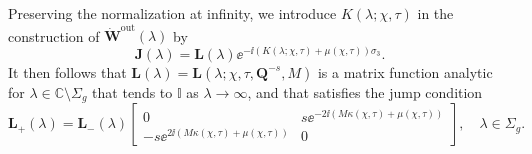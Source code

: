 %
Preserving the normalization at infinity, we introduce $K(\lambda;\chi,\tau)$ in the construction of $\dot{\mathbf{W}}^\text{out}(\lambda)$ by
\begin{equation}
\mathbf{J}(\lambda)=\mathbf{L}(\lambda)\ee^{-\ii (K(\lambda;\chi,\tau)+ \mu(\chi,\tau) )\sigma_3}.
\label{eq:G-H}
\end{equation}
It then follows that $\mathbf{L}(\lambda)=\mathbf{L}(\lambda;\chi,\tau,\mathbf{Q}^{-s},M)$ is a matrix function analytic for $\lambda\in\mathbb{C}\setminus\Sigma_g$ that tends to $\mathbb{I}$ as $\lambda\to\infty$, and that satisfies the jump condition
\begin{equation}
\mathbf{L}_+(\lambda)=\mathbf{L}_-(\lambda)
\begin{bmatrix}0 & s \ee^{-2\ii (M\kappa(\chi,\tau) + \mu(\chi,\tau) )}\\
-s \ee^{2\ii (M\kappa(\chi,\tau) + \mu(\chi,\tau) )} & 0\end{bmatrix}
,\quad \lambda\in\Sigma_g.
\label{eq:H-jump-Sigma-g}
\end{equation}
